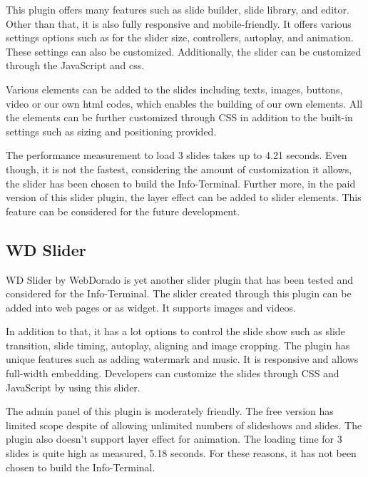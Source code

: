 This plugin offers many features such as slide builder, slide library, and editor. Other than that, it is also fully responsive and mobile-friendly. It offers various settings options such as for the slider size, controllers, autoplay, and animation. These settings can also be customized. Additionally, the slider can be customized through the JavaScript and \ac{css}.

Various elements can be added to the slides including texts, images, buttons, video or our own \ac{html} codes, which enables the building of our own elements. All the elements can be further customized through CSS in addition to the built-in settings such as sizing and positioning provided.

The performance measurement to load 3 slides takes up to 4.21 seconds. Even though, it is not the fastest, considering the amount of customization it allows, the slider has been chosen to build the Info-Terminal. Further more, in the paid version of this slider plugin, the layer effect can be added to slider elements. This feature can be considered for the future development.

\subsection{WD Slider}
WD Slider by WebDorado \cite{WebDorado.2016} is yet another slider plugin that has been tested and considered for the Info-Terminal. The slider created through this plugin can be added into web pages or as widget. It supports images and videos.

In addition to that, it has a lot options to control the slide show such as slide transition, slide timing, autoplay, aligning and image cropping. The plugin has unique features such as adding watermark and music. It is responsive and allows full-width embedding. Developers can customize the slides through CSS and JavaScript by using this slider.

The admin panel of this plugin is moderately friendly. The free version has limited scope despite of allowing unlimited numbers of slideshows and slides. The plugin also doesn't support layer effect for animation. The loading time for 3 slides is quite high as measured, 5.18 seconds. For these reasons, it has not been chosen to build the Info-Terminal.

